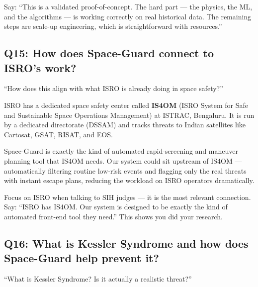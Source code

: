 \documentclass[11pt,a4paper]{article}
\begin{document}
\begin{tipbox}
Say: ``This is a validated proof-of-concept. The hard part --- the physics, the ML, and the algorithms --- is working correctly on real historical data. The remaining steps are scale-up engineering, which is straightforward with resources.''
\end{tipbox}

\vspace{1em}
\subsection*{Q15: How does Space-Guard connect to ISRO's work?}

\begin{questionbox}
``How does this align with what ISRO is already doing in space safety?''
\end{questionbox}

\begin{answerbox}
ISRO has a dedicated space safety center called \textbf{IS4OM} (ISRO System for Safe and Sustainable Space Operations Management) at ISTRAC, Bengaluru. It is run by a dedicated directorate (DSSAM) and tracks threats to Indian satellites like Cartosat, GSAT, RISAT, and EOS.

Space-Guard is exactly the kind of automated rapid-screening and maneuver planning tool that IS4OM needs. Our system could sit upstream of IS4OM --- automatically filtering routine low-risk events and flagging only the real threats with instant escape plans, reducing the workload on ISRO operators dramatically.
\end{answerbox}

\begin{tipbox}
Focus on ISRO when talking to SIH judges --- it is the most relevant connection. Say: ``ISRO has IS4OM. Our system is designed to be exactly the kind of automated front-end tool they need.'' This shows you did your research.
\end{tipbox}

\newpage
\subsection*{Q16: What is Kessler Syndrome and how does Space-Guard help prevent it?}

\begin{questionbox}
``What is Kessler Syndrome? Is it actually a realistic threat?''
\end{questionbox}
\end{document}
